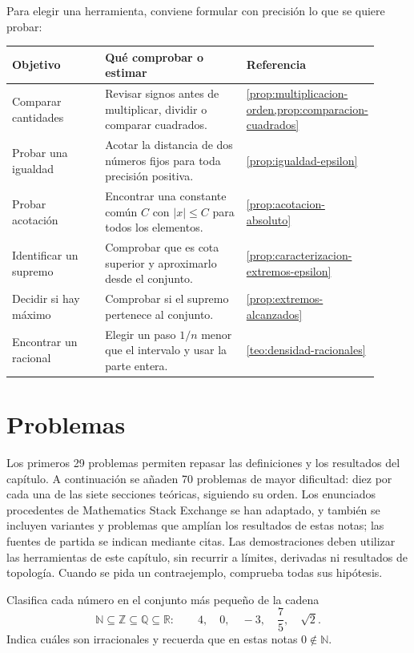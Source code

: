 Para elegir una herramienta, conviene formular con precisión lo que se quiere probar:
\begin{center}
\small
\begin{tabular}{@{}>{\raggedright\arraybackslash}p{0.26\linewidth}>{\raggedright\arraybackslash}p{0.40\linewidth}>{\raggedright\arraybackslash}p{0.25\linewidth}@{}}
\toprule
\textbf{Objetivo} & \textbf{Qué comprobar o estimar} & \textbf{Referencia}\\
\midrule
Comparar cantidades & Revisar signos antes de multiplicar, dividir o comparar cuadrados. & \cref{prop:multiplicacion-orden,prop:comparacion-cuadrados}\\[5pt]
Probar una igualdad & Acotar la distancia de dos números fijos para toda precisión positiva. & \cref{prop:igualdad-epsilon}\\[5pt]
Probar acotación & Encontrar una constante común $C$ con $|x|\leq C$ para todos los elementos. & \cref{prop:acotacion-absoluto}\\[5pt]
Identificar un supremo & Comprobar que es cota superior y aproximarlo desde el conjunto. & \cref{prop:caracterizacion-extremos-epsilon}\\[5pt]
Decidir si hay máximo & Comprobar si el supremo pertenece al conjunto. & \cref{prop:extremos-alcanzados}\\[5pt]
Encontrar un racional & Elegir un paso $1/n$ menor que el intervalo y usar la parte entera. & \cref{teo:densidad-racionales}\\
\bottomrule
\end{tabular}
\end{center}

\clearpage
\section{Problemas}
\label{sec:problemas-reales}
Los primeros 29 problemas permiten repasar las definiciones y los resultados del capítulo. A continuación se añaden 70 problemas de mayor dificultad: diez por cada una de las siete secciones teóricas, siguiendo su orden. Los enunciados procedentes de Mathematics Stack Exchange se han adaptado, y también se incluyen variantes y problemas que amplían los resultados de estas notas; las fuentes de partida se indican mediante citas. Las demostraciones deben utilizar las herramientas de este capítulo, sin recurrir a límites, derivadas ni resultados de topología. Cuando se pida un contraejemplo, comprueba todas sus hipótesis.

\begin{samepage}
\begin{problem}
Clasifica cada número en el conjunto más pequeño de la cadena
\[
\mathbb{N}\subseteq\mathbb{Z}\subseteq\mathbb{Q}\subseteq\mathbb{R}:
\qquad 4,\quad 0,\quad -3,\quad \frac75,\quad \sqrt2.
\]
Indica cuáles son irracionales y recuerda que en estas notas $0\notin\mathbb{N}$.
\end{problem}
\end{samepage}
\par{}

